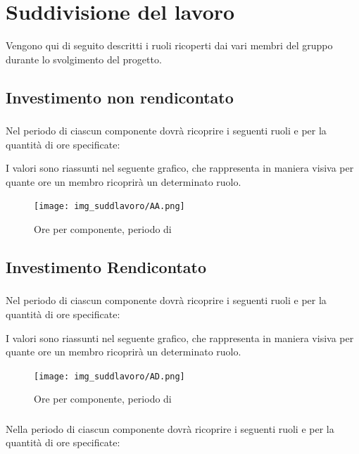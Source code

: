 \section{Suddivisione del lavoro}
Vengono qui di seguito descritti i ruoli ricoperti dai vari membri del gruppo durante lo svolgimento del progetto.
\subsection{Investimento non rendicontato}
\subsubsection{\AR}
Nel periodo di \AR{} ciascun componente dovrà ricoprire i seguenti ruoli e per la quantità di ore specificate:


I valori sono riassunti nel seguente grafico, che rappresenta in maniera visiva per quante ore un membro ricoprirà un determinato ruolo.
\begin{figure}[H]
	\centering
	\texttt{[image: img\_suddlavoro/AA.png]}
	\caption{Ore per componente, periodo di \AR{}}
\end{figure}

\subsection{Investimento Rendicontato}
\subsubsection{\AD}
Nel periodo di \AD{} ciascun componente dovrà ricoprire i seguenti ruoli e per la quantità di ore specificate:


I valori sono riassunti nel seguente grafico, che rappresenta in maniera visiva per quante ore un membro ricoprirà un determinato ruolo.
\begin{figure}[H]
	\centering
	\texttt{[image: img\_suddlavoro/AD.png]}
	\caption{Ore per componente, periodo di \AD{}}
\end{figure}

\subsubsection{\PA}
Nella periodo di \PA{} ciascun componente dovrà ricoprire i seguenti ruoli e per la quantità di ore specificate:


